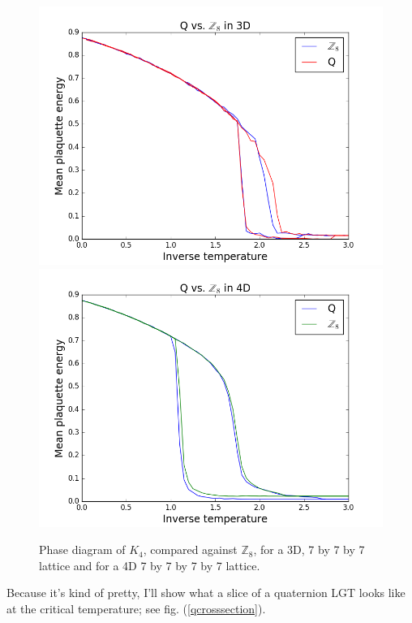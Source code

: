 \documentclass[9pt,twocolumn,twoside]{article}
\begin{document}
\begin{figure}[h!]
	\begin{centering}
	\includegraphics[width=\columnwidth]{qvz8,3d}
	\includegraphics[width=\columnwidth]{qvz8,4d}
	\caption{Phase diagram of $K_4$, compared against $\mathbb{Z}_8$, for a 3D, 7 by 7 by 7 lattice and for a 4D 7 by 7 by 7 by 7 lattice.}
	\label{qvz8}
	\end{centering}
\end{figure}

Because it's kind of pretty, I'll show what a slice of a quaternion LGT looks like at the critical temperature; see fig. (\ref{qcrosssection}).
\end{document}
